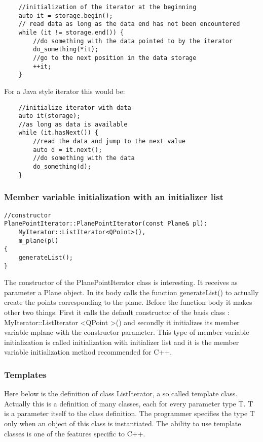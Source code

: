 \begin{lstlisting}
	//initialization of the iterator at the beginning
	auto it = storage.begin();    
	// read data as long as the data end has not been encountered	
	while (it != storage.end()) {  
		//do something with the data pointed to by the iterator		
		do_something(*it);   
		//go to the next position in the data storage 
   		++it;   
	}
\end{lstlisting}

For a Java style iterator this would be:

\begin{lstlisting}
	//initialize iterator with data	
	auto it(storage);     
	//as long as data is available    
	while (it.hasNext()) { 
		//read the data and jump to the next value
		auto d = it.next();  
		//do something with the data
        do_something(d);  
    }
\end{lstlisting}
\subsubsection {Member variable initialization with an initializer list}

\begin{lstlisting}
//constructor
PlanePointIterator::PlanePointIterator(const Plane& pl):
    MyIterator::ListIterator<QPoint>(),
    m_plane(pl)
{
    generateList();
}
\end{lstlisting}

The constructor of the PlanePointIterator class is interesting. It receives as parameter a Plane object. In its body calls the function generateList() to actually create the points corresponding to the plane. Before the function body it makes other two things. First it calls the default constructor of the basis class : MyIterator::ListIterator \textless QPoint \textgreater() and secondly it initializes its member variable m\textunderscore plane with the constructor parameter. This type of member variable initialization is called initialization with initializer list and it is the member variable initialization method recommended for C++. 

\subsubsection {Templates}

Here below is the definition of class ListIterator, a so called template class. Actually this is a definition of many classes, each for every parameter type T. T is a parameter itself to the class definition. The programmer specifies the type T only when an object of this class is instantiated. The ability to use template classes is one of the features specific to C++.

